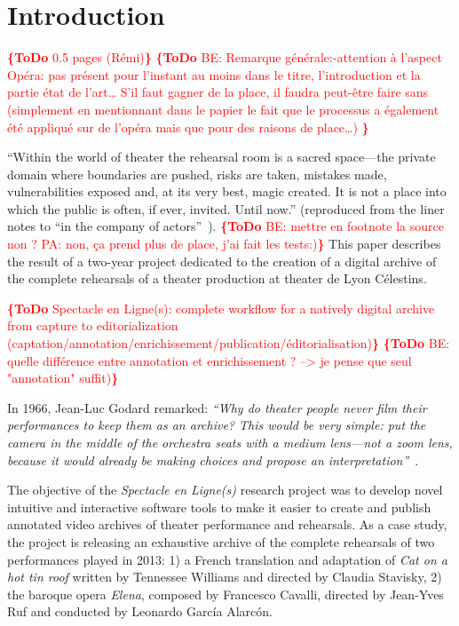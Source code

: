 \documentclass[conference]{IEEEtran}
\newcommand{\todo}[1]{\noindent\textcolor{red}{{\bf \{ToDo} #1{\bf \}}}}
\begin{document}
%
\IEEEpeerreviewmaketitle



\section{Introduction}
\label{sec:intro}

\todo{0.5 pages (Rémi)}
\todo{BE: Remarque générale:-attention à l’aspect Opéra: pas présent pour l’instant au moins dans le titre, l’introduction et la partie état de l’art… S’il faut gagner de la place, il faudra peut-être faire sans (simplement en mentionnant dans le papier le fait que le processus a également été appliqué sur de l’opéra mais que pour des raisons de place…) }

``Within the world of theater the rehearsal room is a sacred space---the private domain where boundaries are pushed, risks are taken, mistakes made, vulnerabilities exposed and, at its very best, magic created. It is not a place into which the public is often, if ever, invited. Until now.'' (reproduced from the liner notes to ``in the company of actors''~\cite{Darling07}). \todo{BE: mettre en footnote la source non ? PA: non, ça prend plus de place, j'ai fait les tests:)}
 This paper describes the result of a two-year project dedicated to the creation of a digital archive  of  the complete  rehearsals of a theater production at theater de Lyon Célestins.

\todo{Spectacle en Ligne(s): complete workflow for a natively digital archive from capture to editorialization
(captation/annotation/enrichissement/publication/éditorialisation)}
\todo{BE: quelle différence entre annotation et enrichissement ? --> je pense que seul "annotation" suffit)}

In 1966, Jean-Luc Godard remarked: {\em ``Why do theater people never film their performances to keep  them as an archive? This would be very simple: put the camera in the middle of the orchestra seats with a medium lens---not a zoom lens, because it would already be making choices and propose an interpretation''}~\cite{Godard66}.

The objective of the \emph{Spectacle en Ligne(s)} research project was to develop novel intuitive and interactive software tools to make it easier to 
create and publish annotated video archives of theater performance and rehearsals. As a case study, the project is releasing an exhaustive archive of the complete rehearsals of two performances played in 2013: 1) a French translation and adaptation of \emph{Cat on a hot tin roof} written by Tennessee Williams and directed by Claudia Stavisky, 2) the baroque opera \emph{Elena}, composed by Francesco Cavalli, directed by Jean-Yves Ruf and conducted by Leonardo García Alarcón.
\end{document}
